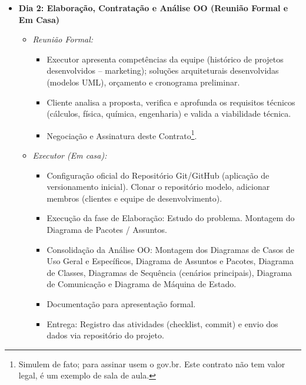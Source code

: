 \documentclass[12pt,a4paper]{article}
\begin{document}
\begin{itemize}[leftmargin=*]
\begin{itemize}
    \item \textbf{Dia 2: Elaboração, Contratação e Análise OO (Reunião Formal e Em Casa)}
    \begin{itemize}
      \item \textit{Reunião Formal:}
      \begin{itemize}
        \item Executor apresenta competências da equipe (histórico de projetos desenvolvidos -- marketing); soluções arquiteturais desenvolvidas (modelos UML), orçamento e cronograma preliminar.
        \item Cliente analisa a proposta, verifica e aprofunda os requisitos técnicos (cálculos, física, química, engenharia) e valida a viabilidade técnica.
        \item Negociação e Assinatura deste Contrato\footnote{Simulem de fato; para assinar usem o gov.br. Este contrato não tem valor legal, é um exemplo de sala de aula.}.
      \end{itemize}
      \item \textit{Executor (Em casa):}
      \begin{itemize}
        \item Configuração oficial do Repositório Git/GitHub (aplicação de versionamento inicial). Clonar o repositório modelo, adicionar membros (clientes e equipe de desenvolvimento).
        \item Execução da fase de Elaboração: Estudo do problema. Montagem do Diagrama de Pacotes / Assuntos.
        \item Consolidação da Análise OO: Montagem dos Diagramas de Casos de Uso Geral e Específicos, Diagrama de Assuntos e Pacotes, Diagrama de Classes, Diagramas de Sequência (cenários principais), Diagrama de Comunicação e Diagrama de Máquina de Estado.
        \item Documentação para apresentação formal.
        \item Entrega: Registro das atividades (checklist, commit) e envio dos dados via repositório do projeto.
      \end{itemize}
    \end{itemize}


\end{itemize}
\end{itemize}
\end{document}
